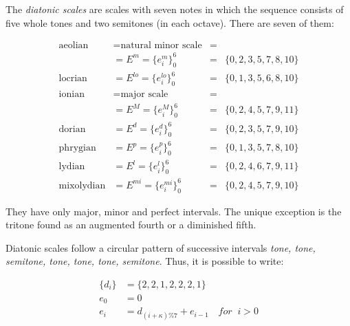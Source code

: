 The \emph{diatonic scales} are scales with seven notes in which the sequence consists of five whole tones and two semitones (in each octave). There are seven of them:

\begin{equation}\label{eq:escalas}
\begin{aligned}
	\text{aeolian}    & = \text{natural minor scale}  & = & \\
			  & = E^m = \{e_i^m\}_0^6       & = & \{0,2,3,5,7,8,10\} \\
	\text{locrian}    & = E^{lo} = \{e_i^{lo}\}_0^6 & = & \{0,1,3,5,6,8,10\} \\ 
	\text{ionian}     & = \text{major scale}          & = &  \\
			  & = E^M = \{e_i^M\}_0^6       & = & \{0,2,4,5,7,9,11\} \\
	\text{dorian}     & = E^{d} = \{e_i^{d}\}_0^6   & = & \{0,2,3,5,7,9,10\} \\
	\text{phrygian}   & = E^{p} = \{e_i^{p}\}_0^6   & = & \{0,1,3,5,7,8,10\} \\
	\text{lydian}     & = E^{l}=\{e_i^{l}\}_0^6     & = & \{0,2,4,6,7,9,11\} \\
	\text{mixolydian} & = E^{mi} = \{e_i^{mi}\}_0^6 & = & \{0,2,4,5,7,9,10\}
\end{aligned}
\end{equation}

\noindent They have only major, minor and perfect intervals.
The unique exception is the tritone found as an augmented fourth or a diminished fifth.

Diatonic scales follow a circular pattern of successive intervals \textit{tone, tone, semitone, tone, tone, tone, semitone}. Thus, it is possible to write:

\begin{equation}\label{eq:relacaoDia}
\begin{split}
\{d_i\} & =\{2,2,1,2,2,2,1\} \\
e_0 & =0 \\
e_i & =d_{(i+\kappa)\%7}+e_{i-1} \quad for \;\;  i > 0
\end{split}
\end{equation}


